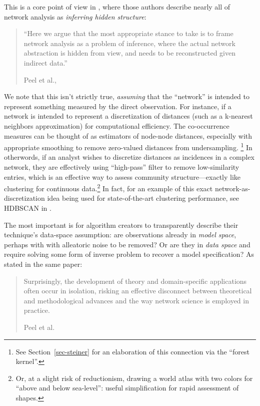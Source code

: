 \documentclass[%
	12pt,
		oneside,
		letterpaper
]{book}
\begin{document}
This is a core point of view in
\textcite{Statisticalinferencelinks_Peel2022}, where those authors
describe nearly all of network analysis as \emph{inferring hidden
structure}:

\begin{quote}
``Here we argue that the most appropriate stance to take is to frame
network analysis as a problem of inference, where the actual network
abstraction is hidden from view, and needs to be reconstructed given
indirect data.''

Peel et al., \autocite{Statisticalinferencelinks_Peel2022}
\end{quote}

We note that this isn't strictly true, \emph{assuming} that the
``network'' is intended to represent something measured by the direct
observation. For instance, if a network is intended to represent a
discretization of distances (such as a k-nearest neighbors
approximation) for computational efficiency. The co-occurrence measures
can be thought of as estimators of node-node distances, especially with
appropriate smoothing to remove zero-valued distances from
undersampling. \footnote{ See Section~\ref{sec-steiner} for an
  elaboration of this connection via the ``forest kernel''.} In
otherwords, if an analyst wishes to discretize distances as incidences
in a complex network, they are effectively using ``high-pass'' filter to
remove low-similarity entries, which is an effective way to assess
community structure---exactly like clustering for continuous
data.\footnote{ Or, at a slight risk of reductionism, drawing a world
  atlas with two colors for ``above and below sea-level'': useful
  simplification for rapid assessment of shapes.} In fact, for an
example of this exact network-as-discretization idea being used for
state-of-the-art clustering performance, see HDBSCAN in
\textcite{HybridApproachHierarchical_Malzer2020}.

The most important is for algorithm creators to transparently describe
their technique's data-space assumption: are observations already in
\emph{model space}, perhaps with with alleatoric noise to be removed? Or
are they in \emph{data space} and require solving some form of inverse
problem to recover a model specification? As stated in the same paper:

\begin{quote}
Surprisingly, the development of theory and domain-specific applications
often occur in isolation, risking an effective disconnect between
theoretical and methodological advances and the way network science is
employed in practice.

Peel et al. \autocite{Statisticalinferencelinks_Peel2022}
\end{quote}
\end{document}
